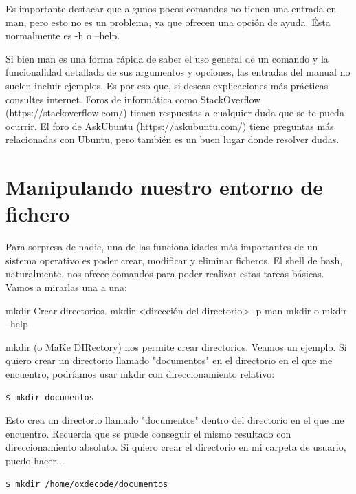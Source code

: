 Es importante destacar que algunos pocos comandos no tienen una entrada en man, pero esto no es un problema, ya que ofrecen una opción de ayuda. Ésta normalmente es -h o --help.

Si bien man es una forma rápida de saber el uso general de un comando y la funcionalidad detallada de sus argumentos y opciones, las entradas del manual no suelen incluir ejemplos. Es por eso que, si deseas explicaciones más prácticas consultes internet. Foros de informática como StackOverflow (https://stackoverflow.com/) tienen respuestas a cualquier duda que se te pueda ocurrir. El foro de AskUbuntu (https://askubuntu.com/) tiene preguntas más relacionadas con Ubuntu, pero también es un buen lugar donde resolver dudas.

\section{Manipulando nuestro entorno de fichero}
Para sorpresa de nadie, una de las funcionalidades más importantes de un sistema operativo es poder crear, modificar y eliminar ficheros. El shell de bash, naturalmente, nos ofrece comandos para poder realizar estas tareas básicas. Vamos a mirarlas una a una:

\begin{command-info}
{mkdir}
{Crear directorios.}
{mkdir <dirección del directorio>}
{-p}
{man mkdir o mkdir --help}
\end{command-info}

mkdir (o MaKe DIRectory) nos permite crear directorios. Veamos un ejemplo. Si quiero crear un directorio llamado "documentos" en el directorio en el que me encuentro, podríamos usar mkdir con direccionamiento relativo:

\begin{tcolorbox-code}
\begin{lstlisting}
$ mkdir documentos
\end{lstlisting}
\end{tcolorbox-code}

Esto crea un directorio llamado "documentos" dentro del directorio en el que me encuentro. Recuerda que se puede conseguir el mismo resultado con direccionamiento absoluto. Si quiero crear el directorio en mi carpeta de usuario, puedo hacer...

\begin{tcolorbox-code}
\begin{lstlisting}
$ mkdir /home/oxdecode/documentos
\end{lstlisting}
\end{tcolorbox-code}

